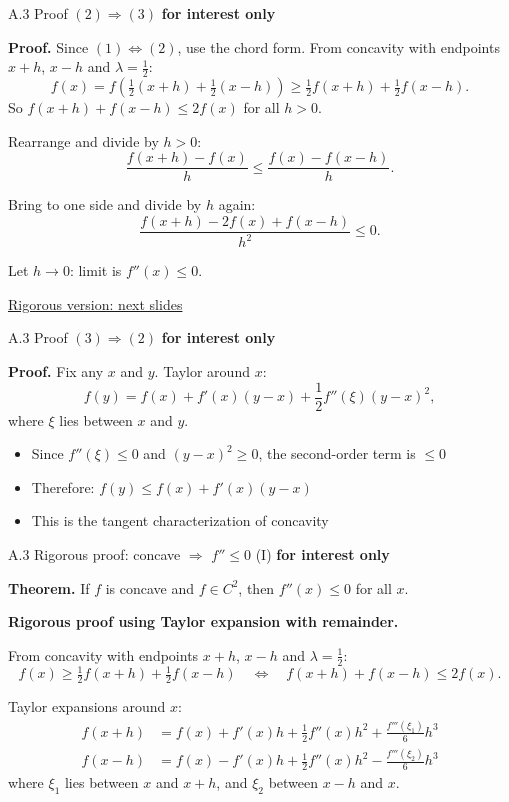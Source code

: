 \documentclass[11pt,aspectratio=169]{beamer}
\newcommand{\InterestOnly}{\textcolor{mAccent}{\textbf{for interest only}}}
\begin{document}
\hypertarget{appendix:concave_23}{}
\begin{frame}{A.3 Proof $(2) \Rightarrow (3)$}
  \small
  \InterestOnly
  
  \textbf{Proof.} Since $(1) \Leftrightarrow (2)$, use the chord form. From concavity with endpoints $x+h$, $x-h$ and $\lambda=\tfrac12$:
  \[
    f(x) = f\!\left(\tfrac12(x+h)+\tfrac12(x-h)\right)
    \geq \tfrac12 f(x+h) + \tfrac12 f(x-h).
  \]
  So $f(x+h) + f(x-h) \leq 2f(x)$ for all $h > 0$.
  
  Rearrange and divide by $h > 0$:
  \[
    \frac{f(x+h) - f(x)}{h} \leq \frac{f(x) - f(x-h)}{h}.
  \]
  
  Bring to one side and divide by $h$ again:
  \[
    \frac{f(x+h) - 2f(x) + f(x-h)}{h^2} \leq 0.
  \]
  
  Let $h \to 0$: limit is $f''(x) \leq 0$.
  
  \vfill
  \hfill\hyperlink{appendix:rigorous_concave}{\scriptsize Rigorous version: next slides}
\end{frame}

\begin{frame}{A.3 Proof $(3) \Rightarrow (2)$}
  \small
  \InterestOnly
  
  \textbf{Proof.} Fix any $x$ and $y$. Taylor around $x$:
  \[
    f(y)
    =
    f(x) + f'(x)(y-x)
    + \frac{1}{2}f''(\xi)(y-x)^2,
  \]
  where $\xi$ lies between $x$ and $y$.
  
  \begin{itemize}
    \item Since $f''(\xi) \leq 0$ and $(y-x)^2 \geq 0$, the second-order term is $\leq 0$
    
    \item Therefore: $f(y) \leq f(x) + f'(x)(y-x)$
    
    \item This is the tangent characterization of concavity
  \end{itemize}
\end{frame}

\hypertarget{appendix:rigorous_concave}{}
\begin{frame}{A.3 Rigorous proof: concave $\Rightarrow$ $f'' \leq 0$ (I)}
  \small
  \InterestOnly
  
  \textbf{Theorem.} If $f$ is concave and $f \in C^2$, then $f''(x) \leq 0$ for all $x$.
  
  \textbf{Rigorous proof using Taylor expansion with remainder.}
  
  From concavity with endpoints $x+h$, $x-h$ and $\lambda=\tfrac12$:
  \[
    f(x) \geq \tfrac12 f(x+h) + \tfrac12 f(x-h)
    \quad\Leftrightarrow\quad
    f(x+h) + f(x-h) \leq 2f(x).
  \]
  
  Taylor expansions around $x$:
  \begin{align*}
    f(x+h) &= f(x) + f'(x)h + \frac{1}{2}f''(x)h^2 + \frac{f'''(\xi_1)}{6}h^3 \\
    f(x-h) &= f(x) - f'(x)h + \frac{1}{2}f''(x)h^2 - \frac{f'''(\xi_2)}{6}h^3
  \end{align*}
  where $\xi_1$ lies between $x$ and $x+h$, and $\xi_2$ between $x-h$ and $x$.
\end{frame}
\end{document}
